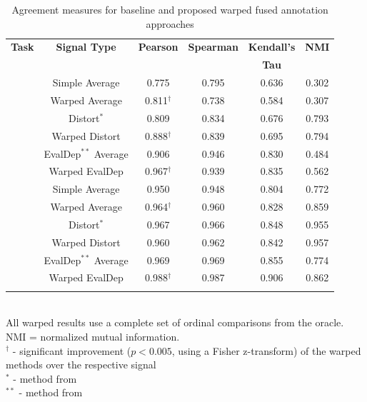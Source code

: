 \documentclass[10pt,letterpaper]{article}
\begin{document}
\setlength\tabcolsep{1pt}
\setlength\extrarowheight{1pt}
\begin{table}[ht!]
\caption{\label{tab:results} Agreement measures for baseline and proposed warped fused annotation approaches}
\centering
\begin{tabular}{ cccccc } 
 \Xhline{2\arrayrulewidth}
 \textbf{Task} & \textbf{Signal Type} & \textbf{Pearson} & \textbf{Spearman} & \textbf{Kendall's} & \textbf{NMI} \\
  & & & & \textbf{Tau} & \\
 \Xhline{2\arrayrulewidth}
 \multirow{6}{*}{\textbf{A}} & Simple Average & 0.775 & 0.795 & 0.636 & 0.302 \\ 
 & Warped Average & 0.811$^\dagger$ & 0.738 & 0.584 & 0.307 \\
 \cline{2-6}
 & Distort$^{*}$ & 0.809 & 0.834 & 0.676 & 0.793 \\
 & Warped Distort & 0.888$^\dagger$ & 0.839 & 0.695 & 0.794 \\
 \cline{2-6}
 & EvalDep$^{**}$ Average & 0.906 & 0.946 & 0.830 & 0.484 \\
 & Warped EvalDep & 0.967$^\dagger$ & 0.939 & 0.835 & 0.562 \\
 \Xhline{2\arrayrulewidth}
 \multirow{6}{*}{\textbf{B}} & Simple Average & 0.950 & 0.948 & 0.804 & 0.772 \\ 
 & Warped Average & 0.964$^\dagger$ & 0.960 & 0.828 & 0.859 \\
 \cline{2-6}
 & Distort$^{*}$  & 0.967 & 0.966 & 0.848 & 0.955 \\
 & Warped Distort  & 0.960 & 0.962 & 0.842 & 0.957 \\
 \cline{2-6}
 & EvalDep$^{**}$ Average  & 0.969 & 0.969 & 0.855 & 0.774 \\
 & Warped EvalDep  & 0.988$^\dagger$ & 0.987 & 0.906 & 0.862 \\
 \Xhline{2\arrayrulewidth}
\end{tabular}
\vspace*{4pt} \\
{\footnotesize All warped results use a complete set of ordinal comparisons from the oracle. NMI = normalized mutual information.  \\ $^\dagger$ - significant improvement ($p<0.005$, using a Fisher z-transform) of the warped methods over the respective signal \\ $^{*}$ - method from \cite{Gupta2016} \\ $^{**}$ - method from \cite{Mariooryad2015}}
\end{table}
\end{document}

